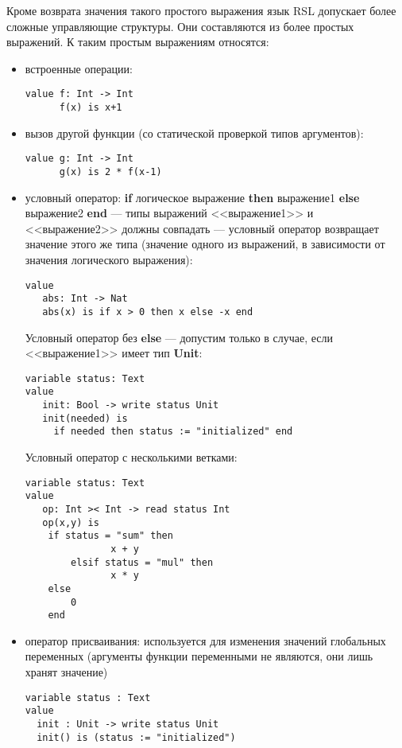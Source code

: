 Кроме возврата значения такого простого выражения язык RSL допускает более сложные управляющие структуры. Они составляются из более простых выражений. К таким простым выражениям относятся:
\begin{itemize}
\item встроенные операции:
\begin{lstlisting}
value f: Int -> Int
      f(x) is x+1
\end{lstlisting}

\item вызов другой функции (со статической проверкой типов аргументов):
\begin{lstlisting}
value g: Int -> Int
      g(x) is 2 * f(x-1)
\end{lstlisting}

\item условный оператор: \textbf{if} логическое выражение \textbf{then} выражение1 \textbf{else} выражение2 \textbf{end} --- типы выражений <<выражение1>> и <<выражение2>> должны совпадать --- условный оператор возвращает значение этого же типа (значение одного из выражений, в зависимости от значения логического выражения):
\begin{lstlisting}
value
   abs: Int -> Nat
   abs(x) is if x > 0 then x else -x end
\end{lstlisting}

Условный оператор без \textbf{else} --- допустим только в случае, если <<выражение1>> имеет тип \textbf{Unit}:
\begin{lstlisting}
variable status: Text
value
   init: Bool -> write status Unit
   init(needed) is
     if needed then status := "initialized" end
\end{lstlisting}

Условный оператор с несколькими ветками:
\begin{lstlisting}
variable status: Text
value
   op: Int >< Int -> read status Int
   op(x,y) is
	if status = "sum" then
               x + y
        elsif status = "mul" then
               x * y
	else
		0
	end
\end{lstlisting}

\item оператор присваивания: используется для изменения значений глобальных переменных (аргументы функции переменными не являются, они лишь хранят значение)
\begin{lstlisting}
variable status : Text
value
  init : Unit -> write status Unit
  init() is (status := "initialized")	
\end{lstlisting}


\end{itemize}
